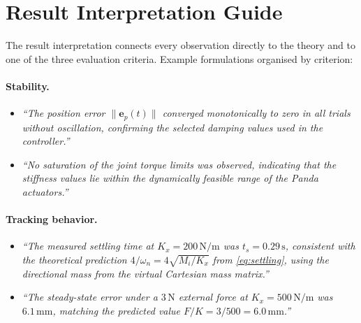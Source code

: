 \section{Result Interpretation Guide}
\label{sec:exp_results}

The result interpretation connects every observation directly to the theory
and to one of the three evaluation criteria.
Example formulations organised by criterion:

\paragraph{Stability.}
\begin{itemize}
  \item \textit{``The position error $\|\mathbf{e}_p(t)\|$ converged
        monotonically to zero in all trials without oscillation, confirming
        the selected damping values used in the controller.''}
  \item \textit{``No saturation of the joint torque limits was observed,
        indicating that the stiffness values lie within the dynamically
        feasible range of the Panda actuators.''}
\end{itemize}

\paragraph{Tracking behavior.}
\begin{itemize}
  \item \textit{``The measured settling time at $K_x=200\,\mathrm{N/m}$
        was $t_s = 0.29\,\mathrm{s}$, consistent with the theoretical
        prediction $4/\omega_n = 4\sqrt{M_i/K_x}$ from
        \cref{eq:settling}, using the directional mass from the virtual
        Cartesian mass matrix.''}
  \item \textit{``The steady-state error under a $3\,\mathrm{N}$ external
        force at $K_x = 500\,\mathrm{N/m}$ was $6.1\,\mathrm{mm}$,
        matching the predicted value $F/K = 3/500 = 6.0\,\mathrm{mm}$.''}
\end{itemize}

